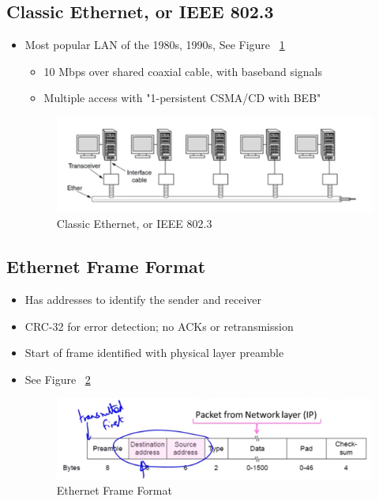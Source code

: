 \documentclass[12pt]{ctexart}   %
\begin{document}
	\subsection{Classic Ethernet, or IEEE 802.3}
	\begin{itemize}
		\item Most popular LAN of the 1980s, 1990s, See Figure~ \ref{fig:3-4-10}
		\begin{itemize}
			\item 10 Mbps over shared coaxial cable, with baseband signals
			\item Multiple access with "1-persistent CSMA/CD with BEB"
		\end{itemize}
		
		 \begin{figure}[h!] %
		\centering
		 \includegraphics[scale=0.7]{images/3-4-10}
		\caption{ Classic Ethernet, or IEEE 802.3 }
		 \label{fig:3-4-10}
		 \end{figure}
	\end{itemize}
	
	\subsection{Ethernet Frame Format}
	\begin{itemize}
		\item Has addresses to identify the sender and receiver
		\item CRC-32 for error detection; no ACKs or retransmission
		\item Start of frame identified with physical layer preamble
		\item See Figure~ \ref{fig:3-4-11}
		
		\begin{figure}[h!] %
		\centering
		 \includegraphics[scale=0.7]{images/3-4-11}
		\caption{ Ethernet Frame Format }
		 \label{fig:3-4-11}
		 \end{figure}
	\end{itemize}
	
\end{document}
